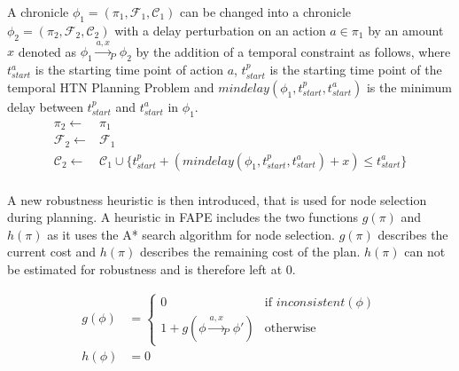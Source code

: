 \begin{definition}
    A chronicle $\phi_1 = (\pi_1,\mathcal{F}_1,\mathcal{C}_1)$ can be changed into a chronicle $\phi_2 = (\pi_2,\mathcal{F}_2,\mathcal{C}_2)$ with a delay perturbation on an action $a \in \pi_1$ by an amount $x$ denoted as $\phi_1 \xrightarrow{a,x}_P \phi_2$ by the addition of a temporal constraint as follows, where $t^a_{start}$ is the starting time point of action $a$, $t^p_{start}$ is the starting time point of the temporal HTN Planning Problem and $mindelay(\phi_1,t^p_{start},t^a_{start})$ is the minimum delay between $t^p_{start}$ and $t^a_{start}$ in $\phi_1$.
    \begin{align*}
        \pi_2 \leftarrow & \pi_1 \\
        \mathcal{F}_2 \leftarrow & \mathcal{F}_1 \\
        \mathcal{C}_2 \leftarrow & \mathcal{C}_1 \cup \{t^p_{start} + (mindelay(\phi_1,t^p_{start},t^a_{start}) + x) \leq t^a_{start}\} \\
    \end{align*}
\end{definition}



A new robustness heuristic is then introduced, that is used for node selection during planning.
A heuristic in FAPE includes the two functions $g(\pi)$ and $h(\pi)$ as it uses the A* search algorithm for node selection.
$g(\pi)$ describes the current cost and $h(\pi)$ describes the remaining cost of the plan.
$h(\pi)$ can not be estimated for robustness and is therefore left at 0.

\begin{align}
    g(\phi) &= \begin{cases}
        0 &\text{if } inconsistent(\phi) \\
        1 + g(\phi \xrightarrow{a,x}_P \phi') &\text{otherwise}
    \end{cases} \label{eq:approach-g-optimal}\\
    h(\phi) &= 0
\end{align}

